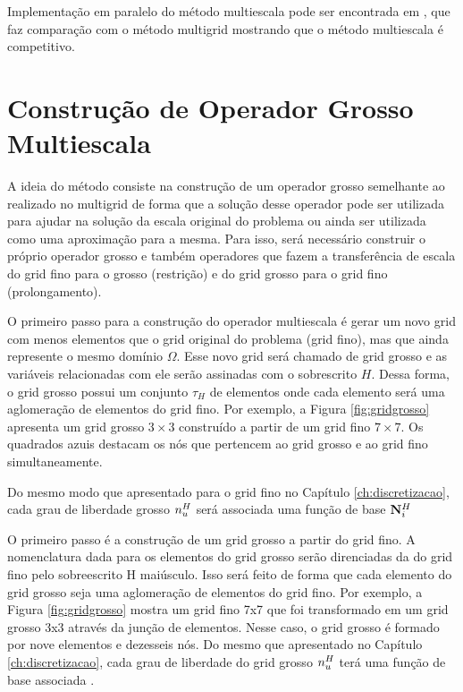 Implementação em paralelo do método multiescala pode ser encontrada em \citet{msparalelo}, que faz comparação com o método multigrid mostrando que o método multiescala é competitivo.

\section{Construção de Operador Grosso Multiescala}

A ideia do método consiste na construção de um operador grosso semelhante ao realizado no multigrid de forma que a solução desse operador pode ser utilizada para ajudar na solução da escala original do problema ou ainda ser utilizada como uma aproximação para a mesma. Para isso, será necessário construir o próprio operador grosso e também operadores que fazem a transferência de escala do grid fino para o grosso (restrição) e do grid grosso para o grid fino (prolongamento).


O primeiro passo para a construção do operador multiescala é gerar um novo grid com menos elementos que o grid original do problema (grid fino), mas que ainda represente o mesmo domínio $\Omega$. Esse novo grid será chamado de grid grosso e as variáveis relacionadas com ele serão assinadas com o sobrescrito $H$. 
Dessa forma, o grid grosso possui um conjunto $\tau_H$ de elementos onde cada elemento será uma aglomeração de elementos do grid fino. Por exemplo, a Figura \ref{fig:gridgrosso} apresenta um grid grosso $3\times 3$ construído a partir de um grid fino $7\times 7$.  Os quadrados azuis destacam os nós que pertencem ao grid grosso e ao grid fino simultaneamente.


Do mesmo modo que apresentado para o grid fino no Capítulo \ref{ch:discretizacao}, cada grau de liberdade grosso $n_u^H$ será associada uma função de base ${\mathbf{N}_{i}^H}$




O primeiro passo é a construção de um grid grosso a partir do grid fino. A nomenclatura dada para os elementos do grid grosso serão direnciadas da do grid fino pelo sobreescrito H maiúsculo. Isso será feito de forma que cada elemento do grid grosso seja uma aglomeração de elementos do grid fino. Por exemplo, a Figura \ref{fig:gridgrosso} mostra um grid fino 7x7 que foi transformado em um grid grosso 3x3 através da junção de elementos. Nesse caso, o grid grosso é formado por nove elementos e dezesseis nós. Do mesmo que apresentado no Capítulo \ref{ch:discretizacao}, cada grau de liberdade do grid grosso $n_u^H$ terá uma função de base associada . 

